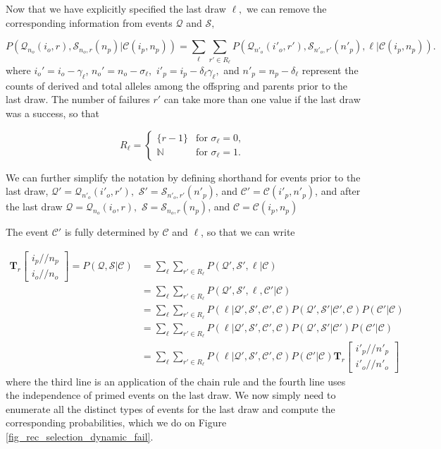 \documentclass[review]{elsarticle}
\newcommand{\dslash}{/\!\!/}
\newcommand{\Coalc}[4]{\begin{bmatrix}#1\dslash #2 \\ #3\dslash #4 \end{bmatrix}}
\newcommand{\CC}{\mathcal{C}}
\newcommand{\ms}{\mathcal{S}}
\newcommand{\QQ}{\mathcal{Q}}
\begin{document}
Now that we have explicitly specified the last draw $\ell,$ we can remove the corresponding
information from events $\QQ$ and $\ms,$ 

\begin{equation}
  P(\QQ_{n_o}(i_o,r), \ms_{n_o,r}(n_p) | \CC{(i_p,n_p)} ) = \sum_\ell \sum_{r' \in R_\ell} P(\QQ_{n'_o}(i'_o,r'), \ms_{n'_o,r'}(n'_p),\ell | \CC{(i_p,n_p)} ) . 
\end{equation}
where $i_o' = i_o-\gamma_\ell$,  $n_o' = n_o-\sigma_\ell,$ $i'_p= i_p - \delta_\ell \gamma_\ell,$  and $n'_p  = n_p - \delta_\ell$ represent the 
counts of derived and total alleles among the offspring and parents prior to the last draw. 
 The number of failures $r'$ can take more than one value if the last draw was a success,
so that 

\begin{equation}
  R_\ell = \begin{cases} 
    \{r-1\}    & \text{for } \sigma_\ell = 0, \\
    \mathbb{N} & \text{for } \sigma_\ell = 1.
  \end{cases}
\end{equation} 

We can further simplify the notation by defining shorthand for events prior to the last draw, $\QQ' =
\QQ_{n'_o}(i'_o,r'),$   $\ms' = \ms_{n'_o,r'}(n'_p)$, and $\CC' = \CC{(i'_p,n'_p)}$, and after the
last draw $\QQ = \QQ_{n_o}(i_o,r),$ $\ms = \ms_{n_o,r}(n_p)$, and $\CC = \CC{(i_p,n_p)}$

The event  $\CC'$ is fully determined by  $\CC$ and $\ell$, so that we can write

\begin{equation}
  \begin{split}
    \mathbf{T}_{r}\Coalc{i_p}{n_p}{i_o}{n_o} = P(\QQ, \ms| \CC) &= \sum_\ell \sum_{r' \in R_\ell}
    P(\QQ', \ms',\ell | \CC) \\ 
    &=\sum_\ell \sum_{r' \in R_\ell}P(\QQ', \ms',\ell, \CC' |\CC) \\
    &=\sum_\ell \sum_{r' \in R_\ell}P(\ell |\QQ', \ms', \CC', \CC ) P(\QQ', \ms'| \CC', \CC)  P(\CC' |\CC) \\
    &=\sum_\ell \sum_{r' \in R_\ell}P(\ell |\QQ', \ms', \CC', \CC ) P(\QQ', \ms'| \CC')       P(\CC' |\CC) \\
    &=\sum_\ell \sum_{r' \in R_\ell}P(\ell |\QQ', \ms', \CC', \CC ) P(\CC' |\CC)  \mathbf{T}_{r}\Coalc{i'_p}{n'_p}{i'_o}{n'_o}
  \end{split}
\end{equation}
where the third line is an application of the chain rule and the fourth line uses the independence
of primed events on the last draw.  We now simply need to enumerate all the distinct types of
events for the last draw and compute the corresponding probabilities, which we do on Figure
\ref{fig_rec_selection_dynamic_fail}.
\end{document}
